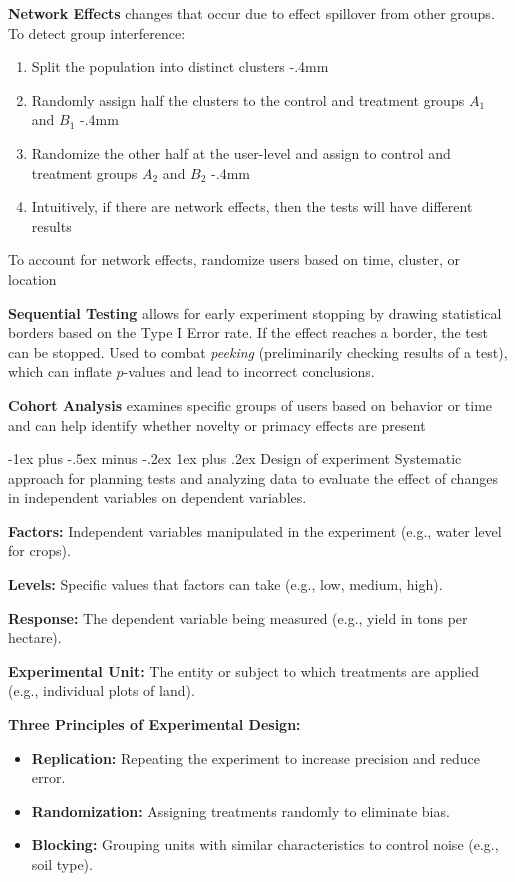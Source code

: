 \documentclass[10pt,landscape]{article}
\makeatletter
\renewcommand{\subsubsection}{\@startsection{subsubsection}{3}{0mm}%
                                {-1ex plus -.5ex minus -.2ex}%
                                {1ex plus .2ex}%
                                {\normalfont\small\bfseries}}
\makeatother
\begin{document}
\begin{multicols}{3}
\textbf{Network Effects} changes that occur due to effect spillover from other groups. To detect group interference:
\begin{enumerate}[leftmargin=5mm]
    \itemsep -.4mm
    \item Split the population into distinct clusters
    \itemsep -.4mm
    \item Randomly assign half the clusters to the control and treatment groups $A_1$ and $B_1$
    \itemsep -.4mm
    \item Randomize the other half at the user-level and assign to control and treatment groups $A_2$ and $B_2$
    \itemsep -.4mm
    \item Intuitively, if there are network effects, then the tests will have different results
\end{enumerate}
To account for network effects, randomize users based on time, cluster, or location

\textbf{Sequential Testing} allows for early experiment stopping by drawing statistical borders based on the Type I Error rate. If the effect reaches a border, the test can be stopped. Used to combat \emph{peeking} (preliminarily checking results of a test), which can inflate $p$-values and lead to incorrect conclusions.

\textbf{Cohort Analysis} examines specific groups of users based on behavior or time and can help identify whether novelty or primacy effects are present

\subsubsection{Design of experiment}
\vspace{-.8mm}
Systematic approach for planning tests and analyzing data to evaluate the effect of changes in independent variables on dependent variables.

\textbf{Factors:} Independent variables manipulated in the experiment (e.g., water level for crops).
    
\textbf{Levels:} Specific values that factors can take (e.g., low, medium, high).
    
\textbf{Response:} The dependent variable being measured (e.g., yield in tons per hectare).
    
\textbf{Experimental Unit:} The entity or subject to which treatments are applied (e.g., individual plots of land).

\vspace{.4mm}
\textbf{Three Principles of Experimental Design:}
\vspace{-.9mm}
\begin{itemize}[label={--},leftmargin=3mm]
    \setlength{\itemsep}{-0.9mm}
    \item \textbf{Replication:} Repeating the experiment to increase precision and reduce error. 
    \item \textbf{Randomization:} Assigning treatments randomly to eliminate bias.
    \item \textbf{Blocking:} Grouping units with similar characteristics to control noise (e.g., soil type).
\end{itemize}


\end{multicols}
\end{document}
